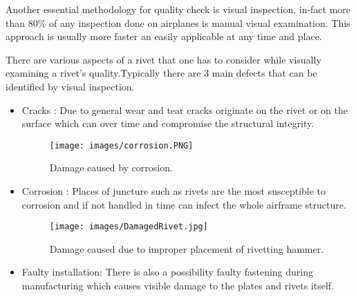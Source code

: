 \documentclass{article}
\begin{document}
    Another essential methodology for quality check is visual inspection, in-fact more than 80\% of any inspection done on airplanes is manual visual examination. This approach is usually more faster an easily applicable at any time and place. 
    
    There are various aspects of a rivet that one has to consider while visually examining a rivet's quality.Typically there are 3 main defects that can be identified by visual inspection. \cite{FAA_visual_Inspection} 
    \begin{itemize}
    
    
        \begin{figure}[H]
        \centering
        \texttt{[image: images/skincrack.PNG]}
        \caption{Examples of skin cracking at fasteners. \cite{FAA_visual_Inspection} }
         \label{fig: rivet/skin crack}
        \end{figure}
    
        \item Cracks : Due to general wear and tear cracks originate on the rivet or on the surface which can over time and compromise the structural integrity. \\ 
        
        \begin{figure}[H]
        \centering
        \texttt{[image: images/corrosion.PNG]}
        \caption{Damage caused by corrosion. \cite{FAA_visual_Inspection} }
         \label{fig:corrosion damage}
        \end{figure}
        
        \item Corrosion : Places of juncture such as rivets are the most susceptible to corrosion and if not handled in time can infect the whole airframe structure.
        
        
        \begin{figure}[H]
        \centering
        \texttt{[image: images/DamagedRivet.jpg]}
        \caption{Damage caused due to improper placement of rivetting hammer. }
         \label{fig:damagedRivet}
        \end{figure}
        
        
        
        \item Faulty installation: There is also a possibility faulty fastening during manufacturing which causes visible damage to the plates and rivets itself.
    \end{itemize}
    
\end{document}

